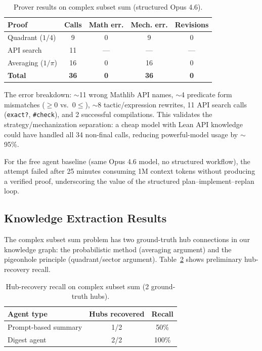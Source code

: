 \begin{table}[h]
  \caption{Prover results on complex subset sum (structured Opus 4.6).}
  \label{tab:prover}
  \small
  \begin{tabular}{lcccc}
    \toprule
    Proof & Calls & Math err. & Mech. err. & Revisions \\
    \midrule
    Quadrant ($1/4$) & 9 & 0 & 9 & 0 \\
    API search & 11 & --- & --- & --- \\
    Averaging ($1/\pi$) & 16 & 0 & 16 & 0 \\
    \midrule
    \textbf{Total} & \textbf{36} & \textbf{0} & \textbf{36} & \textbf{0} \\
    \bottomrule
  \end{tabular}
\end{table}

The error breakdown: $\sim$11 wrong Mathlib API names, $\sim$4 predicate form mismatches ($\geq 0$ vs.\ $0 \leq$), $\sim$8 tactic/expression rewrites, 11 API search calls (\texttt{exact?}, \texttt{\#check}), and 2 successful compilations. This validates the strategy/mechanization separation: a cheap model with Lean API knowledge could have handled all 34 non-final calls, reducing powerful-model usage by $\sim$95\%.

For the free agent baseline (same Opus 4.6 model, no structured workflow), the attempt failed after 25 minutes consuming 1M context tokens without producing a verified proof, underscoring the value of the structured plan--implement--replan loop.

\subsection{Knowledge Extraction Results}

The complex subset sum problem has two ground-truth hub connections in our knowledge graph: the probabilistic method (averaging argument) and the pigeonhole principle (quadrant/sector argument). Table~\ref{tab:digest} shows preliminary hub-recovery recall.

\begin{table}[h]
  \caption{Hub-recovery recall on complex subset sum (2 ground-truth hubs).}
  \label{tab:digest}
  \begin{tabular}{lcc}
    \toprule
    Agent type & Hubs recovered & Recall \\
    \midrule
    Prompt-based summary & 1/2 & 50\% \\
    Digest agent & 2/2 & 100\% \\
    \bottomrule
  \end{tabular}
\end{table}

